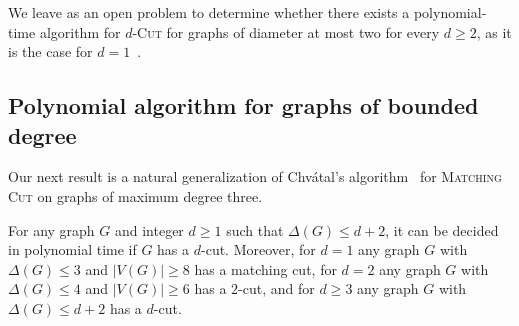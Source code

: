 \documentclass[a4paper,UKenglish,cleveref, autoref]{lipics-v2019}
\newcommand{\ig}[1]{\textcolor{red}{[Ig: #1]}}
\newcommand{\pname}[1]{\textsc{#1}}
\begin{document}
We leave as an open problem to determine whether there exists a  polynomial-time algorithm for \pname{$d$-Cut} for graphs of diameter at most two for every $d \geq 2$, as it is the case for $d=1$~\cite{matching_cut_diameter}.




\subsection{Polynomial algorithm for graphs of bounded degree}
\label{sec:poly-algo}


Our next result is a natural generalization of Chvátal's algorithm~\cite{chvatal_matching_cut} for \pname{Matching Cut} on graphs of maximum degree three.

\begin{theorem}
    \label{thm:small_deg_poly}
    For any graph $G$ and integer $d \geq 1$ such that $\Delta(G) \leq d+2$, it can be decided in polynomial time if $G$ has a $d$-cut. Moreover, for $d=1$ any graph $G$ with $\Delta(G) \leq 3$ and $|V(G)| \geq 8$ has a matching cut, for $d=2$ any graph $G$ with $\Delta(G) \leq 4$ and $|V(G)| \geq 6$ has a $2$-cut, and for $d\geq 3$ any graph $G$ with $\Delta(G) \leq d+2$ has a $d$-cut.
\end{theorem}
\end{document}
